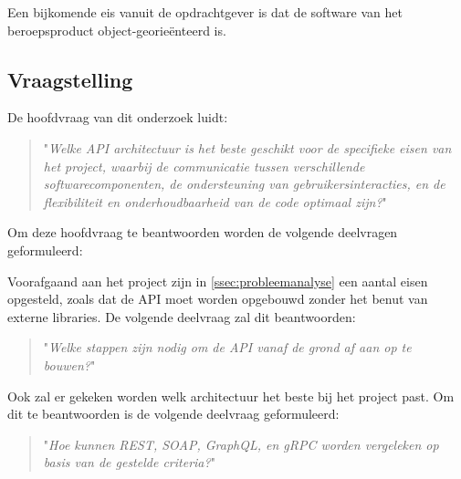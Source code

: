 Een bijkomende eis vanuit de opdrachtgever is dat de software van het beroepsproduct
object-georieënteerd is.

\subsection{Vraagstelling}
De hoofdvraag van dit onderzoek luidt:

\begin{quote}
  "\textit{Welke API architectuur is het beste geschikt voor de specifieke eisen
  van het project, waarbij de communicatie tussen verschillende
  softwarecomponenten, de ondersteuning van gebruikersinteracties, en de
  flexibiliteit en onderhoudbaarheid van de code optimaal zijn?}"
\end{quote}

Om deze hoofdvraag te beantwoorden worden de volgende deelvragen geformuleerd:

Voorafgaand aan het project zijn in \autoref{ssec:probleemanalyse} een aantal
eisen opgesteld, zoals dat de API moet worden opgebouwd zonder het benut van
externe libraries. De volgende deelvraag zal dit beantwoorden:

\begin{quote}
  "\textit{Welke stappen zijn nodig om de API vanaf de grond af aan op te bouwen?}"
\end{quote}

Ook zal er gekeken worden welk architectuur het beste bij het project past. Om
dit te beantwoorden is de volgende deelvraag geformuleerd:

\begin{quote}
  "\textit{Hoe kunnen REST, SOAP, GraphQL, en gRPC worden vergeleken op basis
  van de gestelde criteria?}"
\end{quote}
